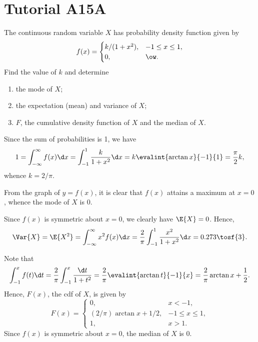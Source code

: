 \section{Tutorial A15A}

\begin{problem}
    The continuous random variable $X$ has probability density function given by \[f(x) = \begin{cases}
        k/(1 + x^2), & -1 \leq x \leq 1,\\
        0, & \ow.
    \end{cases}\]
    Find the value of $k$ and determine
    \begin{enumerate}
        \item the mode of $X$;
        \item the expectation (mean) and variance of $X$;
        \item $F$, the cumulative density function of $X$ and the median of $X$.
    \end{enumerate}
\end{problem}
\begin{solution}
    Since the sum of probabilities is 1, we have \[1 = \int_{-\infty}^{\infty} f(x) \d x = \int_{-1}^1 \frac{k}{1 + x^2} \d x = k \evalint{\arctan x}{-1}{1} = \frac\pi2 k,\] whence $k = 2/\pi$.

    \begin{ppart}
        From the graph of $y = f(x)$, it is clear that $f(x)$ attains a maximum at $x = 0$, whence the mode of $X$ is $0$.
    \end{ppart}
    \begin{ppart}
        Since $f(x)$ is symmetric about $x = 0$, we clearly have $\E{X} = 0$. Hence, \[\Var{X} = \E{X^2} = \int_{-\infty}^\infty x^2 f(x) \d x = \frac2\pi \int_{-1}^1 \frac{x^2}{1 + x^2} \d x = 0.273 \tosf{3}.\]
    \end{ppart}
    \begin{ppart}
        Note that \[\int_{-1}^{x} f(t) \d t = \frac2\pi \int_{-1}^x \frac{\d t}{1 + t^2} = \frac2\pi \evalint{\arctan t}{-1}{x} = \frac2\pi \arctan x + \frac12.\] Hence, $F(x)$, the cdf of $X$, is given by \[F(x) = \begin{cases}
            0, & x < -1,\\
            (2/\pi) \arctan x + 1/2, & -1 \leq x \leq 1,\\
            1, & x > 1.
        \end{cases}\]
        Since $f(x)$ is symmetric about $x = 0$, the median of $X$ is 0.
    \end{ppart}
\end{solution}

